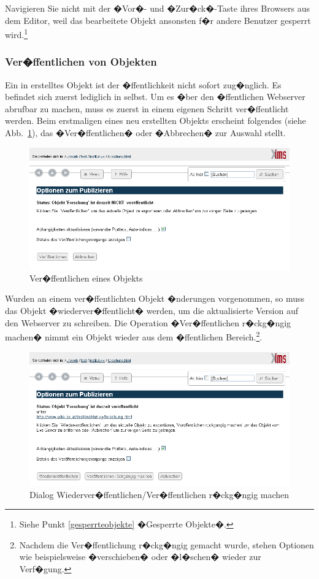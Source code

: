 \begin{Hinweis}
  Navigieren Sie nicht mit der �Vor�- und �Zur�ck�-Taste ihres
  Browsers aus dem Editor, weil das bearbeitete Objekt ansonsten f�r
  andere Benutzer gesperrt wird.\footnote{Siehe Punkt \ref{gesperrteobjekte}
  �Gesperrte Objekte�.}
\end{Hinweis}



\subsubsection{Ver�ffentlichen von Objekten}
\label{quick-publizieren}

Ein in  erstelltes Objekt ist der �ffentlichkeit nicht
sofort zug�nglich. Es befindet sich zuerst lediglich in
 selbst. Um es �ber den �ffentlichen Webserver
abrufbar zu machen, muss es zuerst in einem eigenen Schritt
ver�ffentlicht werden. Beim erstmaligen  eines
neu erstellten Objekts erscheint folgendes 
(siehe Abb.~\ref{fig:XI5S-publish}), das �Ver�ffentlichen� oder
�Abbrechen� zur Auswahl stellt.

\begin{figure}[ht!]
  \centering
  \includegraphics[width=\textwidth]{./images/XI5S-publish.png}
  \caption{Ver�ffentlichen eines Objekts}
  \label{fig:XI5S-publish}
\end{figure}

Wurden an einem ver�ffentlichten Objekt �nderungen vorgenommen, so
muss das Objekt �wiederver�ffentlicht� werden, um die aktualisierte
Version auf den Webserver zu schreiben. Die Operation �Ver�ffentlichen
r�ckg�ngig machen� nimmt ein Objekt wieder aus dem �ffentlichen
Bereich.\footnote{Nachdem die Ver�ffentlichung r�ckg�ngig gemacht
  wurde, stehen Optionen wie beispielsweise �verschieben� oder
  �l�schen� wieder zur Verf�gung.}.

\begin{figure}[H]
  \centering
  \includegraphics[width=\textwidth]{./images/XI5S-republish.png}
  \caption{Dialog Wiederver�ffentlichen/Ver�ffentlichen r�ckg�ngig machen}
  \label{fig:XI5S-republish}
\end{figure}

